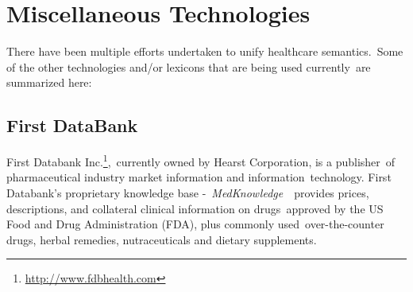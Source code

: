   \section{Miscellaneous Technologies}
  \label{sec:misc}

  There have been multiple efforts undertaken to unify healthcare semantics.\
  Some of the other technologies and/or lexicons that are being used currently\
  are summarized here:

  \subsection{First DataBank\textsuperscript{\texttrademark}}
  \label{sec:fdb}
  First Databank Inc.\footnote{\url{http://www.fdbhealth.com}},\
  currently owned by Hearst Corporation, is a publisher\
  of pharmaceutical industry market information and information\
  technology. First Databank's proprietary knowledge base -\ 
  \emph{MedKnowledge}~\citep{first_databank_fdb_2013}\
  provides prices, descriptions, and collateral clinical information on drugs\
  approved by the US Food and Drug Administration (FDA), plus commonly used\
  over-the-counter drugs, herbal remedies, nutraceuticals and dietary supplements.\\
